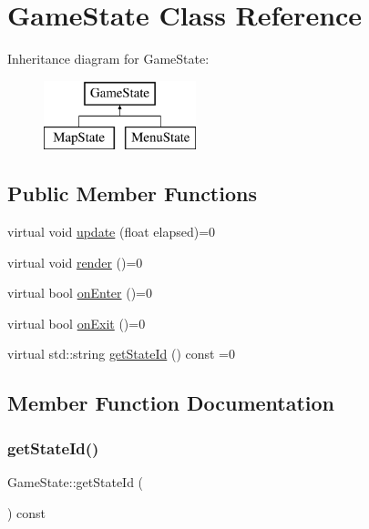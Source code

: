 \hypertarget{class_game_state}{}\section{Game\+State Class Reference}
\label{class_game_state}
Inheritance diagram for Game\+State\+:\begin{figure}[H]
\begin{center}
\leavevmode
\includegraphics[height=2.000000cm]{class_game_state}
\end{center}
\end{figure}
\subsection*{Public Member Functions}
\begin{DoxyCompactItemize}
\item 
virtual void \mbox{\hyperlink{class_game_state_acdace458d1c5a39fdb3bca0d65f88d7d}{update}} (float elapsed)=0
\item 
virtual void \mbox{\hyperlink{class_game_state_ade2f8ae5aa83f8709863437a8ffba12c}{render}} ()=0
\item 
virtual bool \mbox{\hyperlink{class_game_state_ac9dd3f269dda278d57d9a1e3e27461da}{on\+Enter}} ()=0
\item 
virtual bool \mbox{\hyperlink{class_game_state_a17db45d86c52f063cfc854f8ba062178}{on\+Exit}} ()=0
\item 
virtual std\+::string \mbox{\hyperlink{class_game_state_a79e985882263b3e2642ad002c03acaa9}{get\+State\+Id}} () const =0
\end{DoxyCompactItemize}


\subsection{Member Function Documentation}
\mbox{\label{class_game_state_a79e985882263b3e2642ad002c03acaa9}} 
\subsubsection{\texorpdfstring{getStateId()}{getStateId()}}
{\footnotesize\ttfamily Game\+State\+::get\+State\+Id (\begin{DoxyParamCaption}{ }\end{DoxyParamCaption}) const\hspace{0.3cm}{\ttfamily [pure virtual]}}

